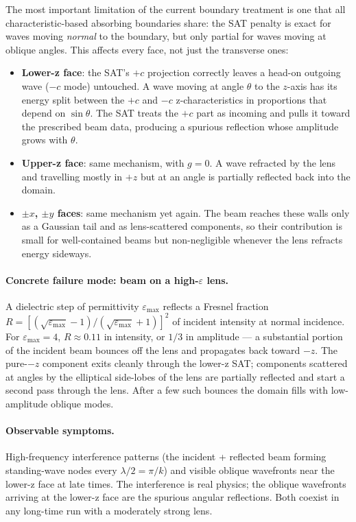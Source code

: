 \documentclass[11pt]{article}
\begin{document}
The most important limitation of the current boundary treatment is one
that all characteristic-based absorbing boundaries share: the SAT
penalty is exact for waves moving \emph{normal} to the boundary, but
only partial for waves moving at oblique angles. This affects every
face, not just the transverse ones:

\begin{itemize}
  \item \textbf{Lower-z face}: the SAT's $+c$ projection correctly
        leaves a head-on outgoing wave ($-c$ mode) untouched. A wave
        moving at angle $\theta$ to the $z$-axis has its energy split
        between the $+c$ and $-c$ z-characteristics in proportions that
        depend on $\sin\theta$. The SAT treats the $+c$ part as
        incoming and pulls it toward the prescribed beam data,
        producing a spurious reflection whose amplitude grows with
        $\theta$.
  \item \textbf{Upper-z face}: same mechanism, with $g = 0$. A wave
        refracted by the lens and travelling mostly in $+z$ but at an
        angle is partially reflected back into the domain.
  \item \textbf{$\pm x$, $\pm y$ faces}: same mechanism yet again. The
        beam reaches these walls only as a Gaussian tail and as
        lens-scattered components, so their contribution is small for
        well-contained beams but non-negligible whenever the lens
        refracts energy sideways.
\end{itemize}

\paragraph{Concrete failure mode: beam on a high-$\varepsilon$ lens.}
A dielectric step of permittivity $\varepsilon_{\max}$ reflects a
Fresnel fraction
$R = \left[(\sqrt{\varepsilon_{\max}} - 1)/(\sqrt{\varepsilon_{\max}}
+ 1)\right]^2$ of incident intensity at normal incidence. For
$\varepsilon_{\max} = 4$, $R \approx 0.11$ in intensity, or $1/3$ in
amplitude — a substantial portion of the incident beam bounces off the
lens and propagates back toward $-z$. The pure-$-z$ component exits
cleanly through the lower-z SAT; components scattered at angles by the
elliptical side-lobes of the lens are partially reflected and start a
second pass through the lens. After a few such bounces the domain
fills with low-amplitude oblique modes.

\paragraph{Observable symptoms.} High-frequency interference patterns
(the incident + reflected beam forming standing-wave nodes every
$\lambda/2 = \pi/k$) and visible oblique wavefronts near the lower-z
face at late times. The interference is real physics; the oblique
wavefronts arriving at the lower-z face are the spurious angular
reflections. Both coexist in any long-time run with a moderately
strong lens.
\end{document}

